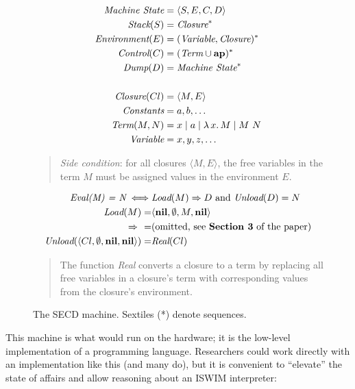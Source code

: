\documentclass{article}
\begin{document}
\begin{figure}[ht]
  \begin{align*}
    \emph{Machine State}   &= \langle S, E, C, D \rangle
  \\\emph{Stack} (S)       &= \emph{Closure}^*
  \\\emph{Environment} (E) &= (\emph{Variable}, \emph{Closure})^*
  \\\emph{Control} (C)     &= (\emph{Term} \cup {\bf ap})^*
  \\\emph{Dump} (D)        &= \emph{Machine State}^*
  \\
  \\\emph{Closure} (Cl)    &= \langle M, E \rangle 
  \\\emph{Constants}       &= a,b,\ldots
  \\\emph{Term} (M,N)      &= x \mid a \mid \lambda\,x.\,M \mid M~N
  \\\emph{Variable}        &= x,y,z,\ldots
  \end{align*}

  \begin{quote}
    \emph{Side condition}: for all closures $\langle M, E \rangle$, the free variables in the term $M$ must be assigned values in the environment $E$.
  \end{quote}
  
  \begin{align*}
    \emph{Eval(M) = N} \iff& \emph{Load}(M) \Rightarrow D \mbox{ and } \emph{Unload}(D) = N
  \\\emph{Load}(M) =& \langle {\bf nil}, \emptyset, M, {\bf nil} \rangle
  \\\Rightarrow~~  =& \mbox{(omitted, see {\bf Section 3} of the paper)}
  \\\emph{Unload}(\langle Cl, \emptyset, {\bf nil}, {\bf nil}\rangle) =& \emph{Real}(Cl)
  \end{align*}

  \begin{quote}
    The function \emph{Real} converts a closure to a term by replacing all free variables in a closure's term with corresponding values from the closure's environment.
  \end{quote}
\label{fig:secd}
\caption{The SECD machine. Sextiles (*) denote sequences.}
\end{figure}

This machine is what would run on the hardware; it is the low-level implementation of a programming language.
Researchers could work directly with an implementation like this (and many do), but it is convenient to ``elevate'' the state of affairs and allow reasoning about an ISWIM interpreter:
\end{document}
